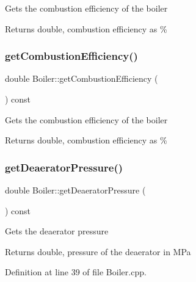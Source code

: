 Gets the combustion efficiency of the boiler \begin{DoxyReturn}{Returns}
double, combustion efficiency as \% 
\end{DoxyReturn}
\mbox{\label{class_boiler_a21c7423b756761c3216704b3f554feff}} 
\subsubsection{\texorpdfstring{get\+Combustion\+Efficiency()}{getCombustionEfficiency()}\hspace{0.1cm}{\footnotesize\ttfamily [3/3]}}
{\footnotesize\ttfamily double Boiler\+::get\+Combustion\+Efficiency (\begin{DoxyParamCaption}{ }\end{DoxyParamCaption}) const}

Gets the combustion efficiency of the boiler \begin{DoxyReturn}{Returns}
double, combustion efficiency as \% 
\end{DoxyReturn}
\mbox{\label{class_boiler_aad4786e7b68084e65a35dd6235517b8c}} 
\subsubsection{\texorpdfstring{get\+Deaerator\+Pressure()}{getDeaeratorPressure()}\hspace{0.1cm}{\footnotesize\ttfamily [1/3]}}
{\footnotesize\ttfamily double Boiler\+::get\+Deaerator\+Pressure (\begin{DoxyParamCaption}{ }\end{DoxyParamCaption}) const}

Gets the deaerator pressure \begin{DoxyReturn}{Returns}
double, pressure of the deaerator in M\+Pa 
\end{DoxyReturn}


Definition at line 39 of file Boiler.\+cpp.

\mbox{\label{class_boiler_aad4786e7b68084e65a35dd6235517b8c}} 
